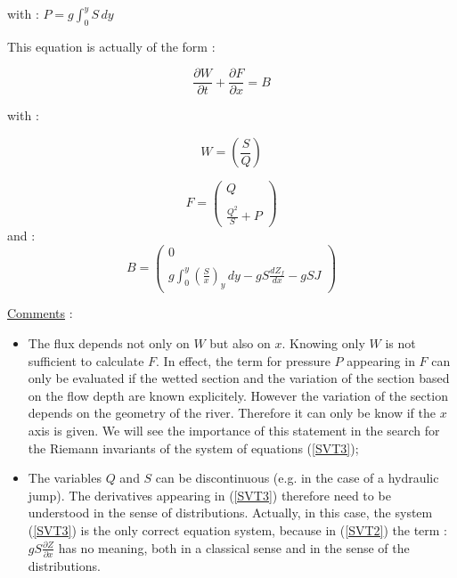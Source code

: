 with : $P = g \int_{0}^{y} S \, dy$

\vspace{0.5cm}

This equation is actually of the form :

\begin{equation}
 \frac{\partial W}{\partial t} + \frac{\partial F}{\partial x} = B
\end{equation}

with :

\begin{equation}
 W = \left ( \frac{S}{Q} \right )
\end{equation}

\begin{equation}
 F = \left ( 
    \begin{array}{c}
    Q \\
    \\
    \frac{Q^2}{S} + P
\end{array}
\right )
\end{equation}
and :
\begin{equation}
 B = \left ( 
    \begin{array}{c}
    0 \\
    \\
    g \int_{0}^y \left ( \frac{S}{x} \right )_y \, dy - g S \frac{dZ_f}{dx} - g S J
\end{array}
\right )
\end{equation}

\vspace{0.5cm}

\underline{Comments} :
\begin{itemize}
 \item The flux depends not only on $W$ but also on $x$. Knowing only $W$ is not sufficient to calculate $F$. In effect, the term for pressure $P$ appearing in $F$ can only be evaluated if the wetted section and the variation of the section based on the flow depth are known explicitely. However the variation of the section depends on the geometry of the river. Therefore it can only be know if the $x$ axis is given. We will see the importance of this statement in the search for the Riemann invariants of the system of equations (\ref{SVT3});
 \item The variables $Q$ and $S$ can be discontinuous (e.g. in the case of a hydraulic jump). The derivatives appearing in (\ref{SVT3}) therefore need to be understood in the sense of distributions. Actually, in this case, the system (\ref{SVT3}) is the only correct equation system, because in (\ref{SVT2}) the term : $g S \frac{\partial Z}{\partial x}$ has no meaning, both in a classical sense and in the sense of the distributions.
\end{itemize}

